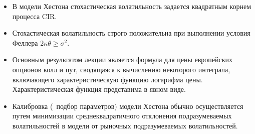 \summary
\begin{itemize}
\item В модели Хестона стохастическая волатильность задается квадратным корнем процесса CIR. 
\item Стохастическая волатильность строго положительна при выполнении условия Феллера $2\kappa\theta\ge\sigma^2$.
\item Основным результатом лекции является формула для цены европейских опционов колл и пут, сводящаяся к вычислению некоторого интеграла, включающего характеристическую функцию логарифма цены.
Характеристическая функция представима в явном виде.
\item Калибровка (\te\ подбор параметров) модели Хестона обычно осуществляется путем минимизации среднеквадратичного отклонения подразумеваемых волатильностей в модели от рыночных подразумеваемых волатильностей.
\end{itemize}
